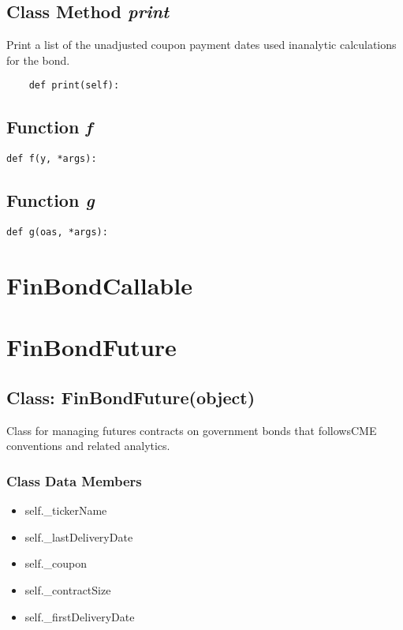 \documentclass[twoside,11pt]{book}
\begin{document}
\subsection{Class Method {\it print}}
Print a list of the unadjusted coupon payment dates used inanalytic calculations for the bond. 

\begin{lstlisting}
    def print(self):
\end{lstlisting}

\subsection{Function {\it f}}


\begin{lstlisting}
def f(y, *args):
\end{lstlisting}

\subsection{Function {\it g}}


\begin{lstlisting}
def g(oas, *args):
\end{lstlisting}

\newpage
\section{FinBondCallable}

\newpage
\section{FinBondFuture}

\subsection{Class: FinBondFuture(object)}
Class for managing futures contracts on government bonds that followsCME conventions and related analytics. 

\subsubsection{Class Data Members}
\begin{itemize}
\item{self.\_tickerName}
\item{self.\_lastDeliveryDate}
\item{self.\_coupon}
\item{self.\_contractSize}
\item{self.\_firstDeliveryDate}
\end{itemize}
\end{document}
